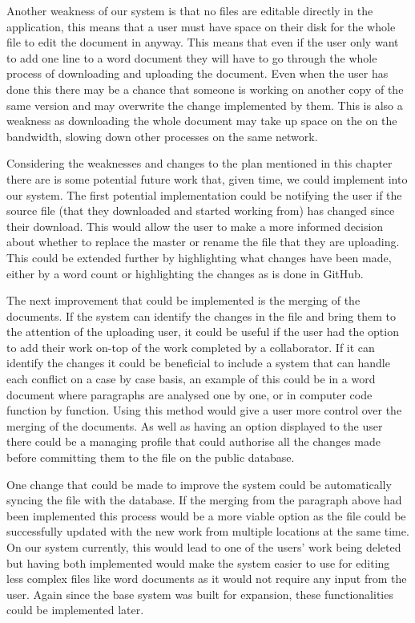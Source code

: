 \documentclass[11pt]{article}
\begin{document}
Another weakness of our system is that no files are editable directly in the application, this means that a user must have space on their disk for the whole file to edit the document in anyway. This means that even if the user only want to add one line to a word document they will have to go through the whole process of downloading and uploading the document. Even when the user has done this there may be a chance that someone is working on another copy of the same version and may overwrite the change implemented by them. This is also a weakness as downloading the whole document may take up space on the on the bandwidth, slowing down other processes on the same network.

Considering the weaknesses and changes to the plan mentioned in this chapter there are is some potential future work that, given time, we could implement into our system. The first potential implementation could be notifying the user if the source file (that they downloaded and started working from) has changed since their download. This would allow the user to make a more informed decision about whether to replace the master or rename the file that they are uploading. This could be extended further by highlighting what changes have been made, either by a word count or highlighting the changes as is done in GitHub. 

The next improvement that could be implemented is the merging of the documents. If the system can identify the changes in the file and bring them to the attention of the uploading user, it could be useful if the user had the option to add their work on-top of the work completed by a collaborator. If it can identify the changes it could be beneficial to include a system that can handle each conflict on a case by case basis, an example of this could be in a word document where paragraphs are analysed one by one, or in computer code function by function. Using this method would give a user more control over the merging of the documents. As well as having an option displayed to the user there could be a managing profile that could authorise all the changes made before committing them to the file on the public database.

One change that could be made to improve the system could be automatically syncing the file with the database. If the merging from the paragraph above had been implemented this process would be a more viable option as the file could be successfully updated with the new work from multiple locations at the same time. On our system currently, this would lead to one of the users’ work being deleted but having both implemented would make the system easier to use for editing less complex files like word documents as it would not require any input from the user. Again since the base system was built for expansion, these functionalities could be implemented later.
\end{document}
